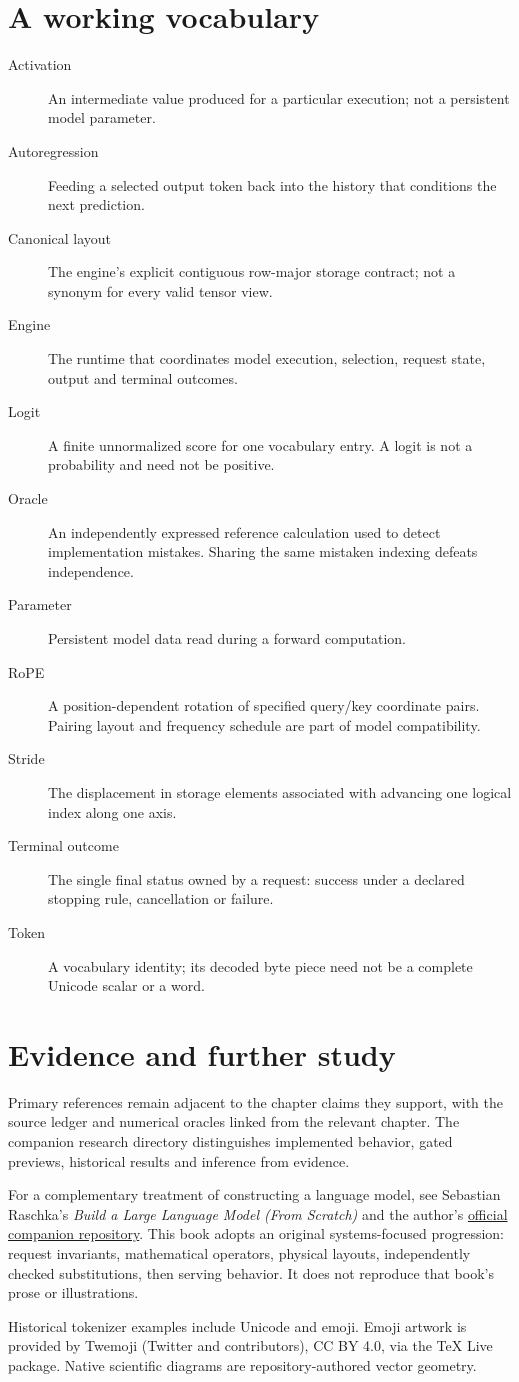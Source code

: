 \chapter{A working vocabulary}
\begin{description}
\item[Activation] An intermediate value produced for a particular execution;
not a persistent model parameter.
\item[Autoregression] Feeding a selected output token back into the history
that conditions the next prediction.
\item[Canonical layout] The engine's explicit contiguous row-major storage
contract; not a synonym for every valid tensor view.
\item[Engine] The runtime that coordinates model execution, selection, request
state, output and terminal outcomes.
\item[Logit] A finite unnormalized score for one vocabulary entry. A logit is
not a probability and need not be positive.
\item[Oracle] An independently expressed reference calculation used to detect
implementation mistakes. Sharing the same mistaken indexing defeats independence.
\item[Parameter] Persistent model data read during a forward computation.
\item[RoPE] A position-dependent rotation of specified query/key coordinate
pairs. Pairing layout and frequency schedule are part of model compatibility.
\item[Stride] The displacement in storage elements associated with advancing
one logical index along one axis.
\item[Terminal outcome] The single final status owned by a request:
success under a declared stopping rule, cancellation or failure.
\item[Token] A vocabulary identity; its decoded byte piece need not be a
complete Unicode scalar or a word.
\end{description}

\chapter{Evidence and further study}
Primary references remain adjacent to the chapter claims they support, with
the source ledger and numerical oracles linked from the relevant chapter.
The companion research directory distinguishes implemented behavior, gated
previews, historical results and inference from evidence.

For a complementary treatment of constructing a language model, see Sebastian
Raschka's \emph{Build a Large Language Model (From Scratch)} and the author's
\href{https://github.com/rasbt/LLMs-from-scratch}{official companion repository}.
This book adopts an original systems-focused progression: request invariants,
mathematical operators, physical layouts, independently checked substitutions,
then serving behavior. It does not reproduce that book's prose or illustrations.

Historical tokenizer examples include Unicode and emoji. Emoji artwork is
provided by Twemoji (Twitter and contributors), CC BY 4.0, via the TeX Live
package. Native scientific diagrams are repository-authored vector geometry.
